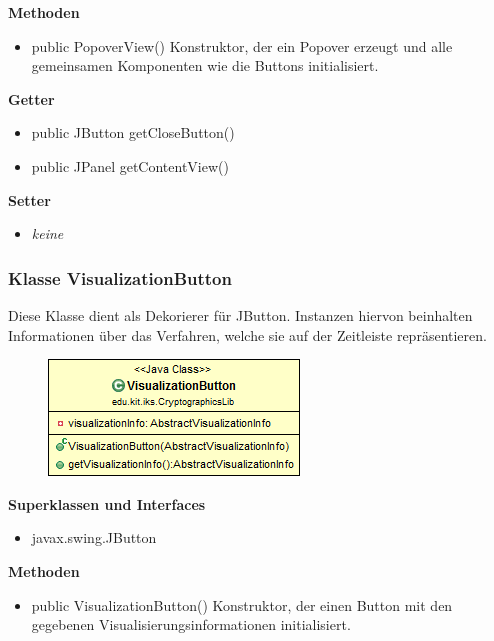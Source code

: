 \documentclass{article}
\begin{document}
      \textbf{Methoden}
      \begin{itemize}
        \item public PopoverView() \newline
          Konstruktor, der ein Popover erzeugt und alle gemeinsamen Komponenten wie
          die Buttons initialisiert.
      \end{itemize}
      
      \textbf{Getter}
      \begin{itemize}
		\item public JButton getCloseButton()
		\item public JPanel getContentView()
      \end{itemize}
      
      \textbf{Setter}
      \begin{itemize}
        \item \textit{keine}
      \end{itemize}
	
	\subsubsection{Klasse VisualizationButton}
	  Diese Klasse dient als Dekorierer für JButton. Instanzen hiervon beinhalten Informationen über das Verfahren, welche sie auf der Zeitleiste repräsentieren.
	
      \begin{figure}[H]
        \centering
        \includegraphics{resources/edu-kit-iks-CryptographicsLib-VisualizationButton}
      \end{figure}
	
      \textbf{Superklassen und Interfaces}
      \begin{itemize}
        \item javax.swing.JButton
      \end{itemize}
	
      \textbf{Methoden}
      \begin{itemize}
        \item public VisualizationButton() \newline
          Konstruktor, der einen Button mit den gegebenen Visualisierungsinformationen initialisiert.
      \end{itemize}
      
\end{document}
